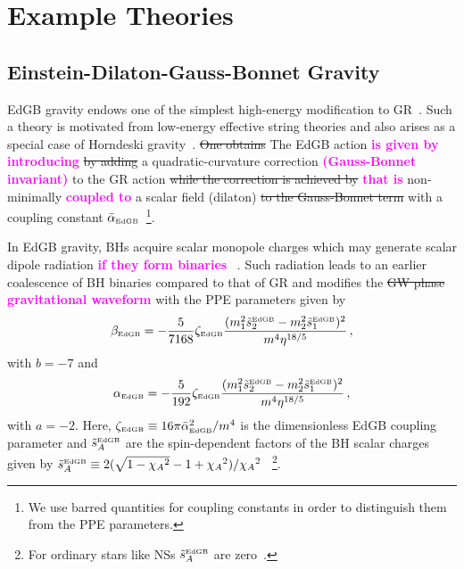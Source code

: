 \documentclass[prd,twocolumn,nofootinbib]{revtex4-1}
\newcommand{\EDGB}{{\mbox{\tiny EdGB}}}
\newcommand{\kent}[1]{\textcolor{magenta}{\textbf{#1}} }
\begin{document}
\section{Example Theories}
\subsection{Einstein-Dilaton-Gauss-Bonnet Gravity}
EdGB gravity endows one of the simplest high-energy modification to GR~\cite{Moura:2006pz,Pani:2009wy}. Such a theory is motivated from low-energy effective string theories and also arises as a special case of Horndeski gravity~\cite{Zhang:2017unx,Berti:2015itd}. 
\sout{One obtains} The EdGB action \kent{is given by introducing} \sout{by adding} a quadratic-curvature correction \kent{(Gauss-Bonnet invariant)} to the GR action \sout{while the correction is achieved by} \kent{that is} non-minimally \kent{coupled to} a scalar field (dilaton) \sout{to the Gauss-Bonnet term} with a coupling constant $\bar{\alpha}_\EDGB$~\cite{Kanti:1995vq}\footnote{We use barred quantities for coupling constants in order to distinguish them from the PPE parameters.}.

In EdGB gravity, BHs acquire scalar monopole charges which may generate scalar dipole radiation \kent{if they form binaries}~\cite{Yagi:2011xp,Sotiriou:2014pfa,Berti:2018cxi,Prabhu:2018aun}. Such radiation leads to an earlier coalescence of BH binaries compared to that of GR and modifies the \sout{GW phase} \kent{gravitational waveform} with the PPE parameters given by~\cite{Yunes:2016jcc,Yagi:2011xp}
\begin{equation}
 \beta_\EDGB=-\frac{5}{7168}\zeta_\EDGB\frac{(m_1^2\tilde s_2^\EDGB-m_2^2\tilde s_1^\EDGB)^2}{m^4\eta^{18/5}}\,,
 \end{equation}
 with $b=-7$ and 
  \begin{equation}
 \alpha_\EDGB=-\frac{5}{192}\zeta_\EDGB\frac{(m_1^2 \tilde s_2^\EDGB-m_2^2 \tilde s_1^\EDGB)^2}{m^4\eta^{18/5}}\,,
 \end{equation}
 with $a=-2$.  Here, $\zeta_\EDGB\equiv 16 \pi \bar{\alpha}_\EDGB^2/m^4$ is the dimensionless EdGB coupling parameter and $\tilde s_{A}^\EDGB$ are the spin-dependent factors of the BH scalar charges given by $\tilde s_{A}^\EDGB\equiv 2(\sqrt{1-{\chi_A}^2}-1+{\chi_A}^2)/{\chi_A}^2~$~\cite{Berti:2018cxi,Prabhu:2018aun}\footnote{For ordinary stars like NSs $\tilde s_A^\EDGB$ are zero~\cite{Yagi:2011xp,Yagi:2015oca}.}.
\end{document}
